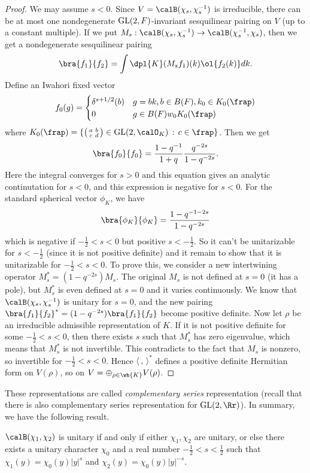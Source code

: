 \begin{proof}
We may assume $s<0$. Since $V = \calB(\chi_s, \chi_s^{-1})$ is irreducible, there can be at most one nondegenerate $\mathrm{GL}(2, F)$-invariant sesquilinear pairing on $V$ (up to a constant multiple). 
If we put $M_{s}: \calB(\chi_s, \chi_s^{-1})\to \calB(\chi_s^{-1}, \chi_s)$, then we get a nondegenerate sesquilinear pairing
$$
\bra{f_1}{f_2} = \int\dpl{K} (M_s f_1)(k) \ol{f_{2}(k)} dk. 
$$
Define an Iwahori fixed vector 
$$
f_{0}(g) = \begin{cases} \delta^{s+1/2}(b) & g = bk, b\in B(F), k_{0} \in K_{0}(\frap) \\ 0 & g \in B(F)w_{0}K_{0}(\frap) \end{cases}
$$
where $K_{0}(\frap) = \{ \smat{a}{b}{c}{d}\in \GL(2 ,\calO_{K})\,:\, c\in \frap\}$. 
Then we get
$$
\bra{f_0}{f_0} = \frac{1-q^{-1}}{1+q} \frac{q^{-2s}}{1-q^{-2s}}.
$$
Here the integral converges for $s>0$ and this equation gives an analytic continutation for $s<0$, and this expression is negative for $s<0$. 
For the standard spherical vector $\phi_K$, we have
$$
\bra{\phi_K}{\phi_K} = \frac{1-q^{-1-2s}}{1-q^{-2s}}
$$
which is negative if $-\frac{1}{2} < s < 0$ but positive $s<-\frac{1}{2}$. 
So it can't be unitarizable for $s< -\frac{1}{2}$ (since it is not positive definite) and it remain to show that it is unitarizable for $-\frac{1}{2} < s< 0$. 
To prove this, we consider a new intertwining operator $M_{s}^{*} = (1-q^{-2s})M_{s}$. 
The original $M_{s}$ is not defined at $s = 0$ (it has a pole), but $M_{s}^{*}$ is even defined at $s = 0$ and it varies continuously. 
We know that $\calB(\chi_s, \chi_s^{-1})$ is unitary for $s = 0$, and the new pairing $\bra{f_1}{f_2}^{*} = (1-q^{-2s})\bra{f_1}{f_2}$ become positive definite. 
Now let $\rho$ be an irreducible admissible representation of $K$. 
If it is not positive definite for some $-\frac{1}{2} <s < 0$, then there exists $s$ such that $M_{s}^{*}$ has zero eigenvalue, which means that $M_{s}^{*}$ is not invertible. This contradicts to the fact that $M_{s}$ is nonzero, so invertible for $-\frac{1}{2} <s < 0$. 
Hence $\langle \,,\,\rangle^{*}$ defines a positive definite Hermitian form on $V(\rho)$, so on $V = \oplus_{\rho \in \wh{K}} V(\rho)$. 
\end{proof}
These representations are called \emph{complementary series} representation (recall that there is also complementary series representation for $\GL(2, \Rr)$). In summary, we have the following result. 
\begin{theorem}
$\calB(\chi_1, \chi_2)$ is unitary if and only if either $\chi_1, \chi_2$ are unitary, or else there exists a unitary character $\chi_0$ and a real number $-\frac{1}{2} < s < \frac{1}{2}$ such that $\chi_1(y) = \chi_0(y)|y|^{s}$ and $\chi_2(y) = \chi_0(y) |y|^{-s}$. 
\end{theorem}



